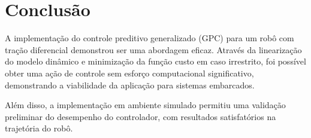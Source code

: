 \section{Conclusão}

A implementação do controle preditivo generalizado (GPC)
para um robô com tração diferencial demonstrou ser 
uma abordagem eficaz.
Através da linearização do modelo dinâmico e minimização da função 
custo em caso irrestrito, foi possível obter uma ação de controle 
sem esforço computacional significativo, demonstrando a viabilidade
da aplicação para sistemas embarcados. 

\vspace{1em}
Além disso, a implementação em ambiente simulado
permitiu uma validação preliminar do desempenho do controlador,
com resultados satisfatórios na trajetória do robô.

